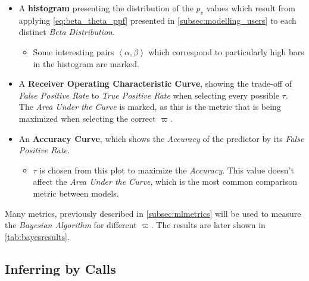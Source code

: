 \begin{itemize}
	\item A \textbf{histogram} presenting the distribution of the $p_v$ values which result from applying \cref{eq:beta_theta_ppf} presented in \cref{subsec:modelling_users} to each distinct \emph{Beta Distribution}.
	\begin{itemize}
		\item Some interesting pairs $\left< \alpha, \beta \right>$ which correspond to particularly high bars in the histogram are marked.
	\end{itemize}
	\item A \textbf{Receiver Operating Characteristic Curve}, showing the trade-off of \emph{False Positive Rate} to \emph{True Positive Rate} when selecting every possible $\tau$. The \emph{Area Under the Curve} is marked, as this is the metric that is being maximized when selecting the correct $\varpi$.
	\item An \textbf{Accuracy Curve}, which shows the \emph{Accuracy} of the predictor by its \emph{False Positive Rate}.
	\begin{itemize}
		\item $\tau$ is chosen from this plot to maximize the \emph{Accuracy}. This value doesn't affect the \emph{Area Under the Curve}, which is the most common comparison metric between models.
	\end{itemize}
\end{itemize}

Many metrics, previously described in \cref{subsec:mlmetrics} will be used to measure the \emph{Bayesian Algorithm} for different $\varpi$. The results are later shown in \cref{tab:bayesresults}.

\newpage
\subsection{Inferring by Calls}
\label{subsec:calls_infer}

